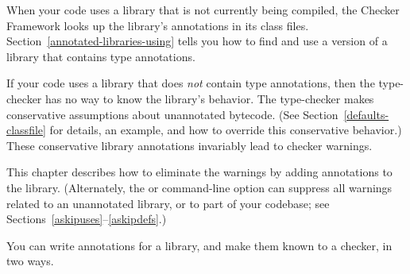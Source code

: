 \htmlhr
{}

When your code uses a library that is not currently being compiled,
the Checker Framework looks up the library's annotations in its class files.
Section~\ref{annotated-libraries-using} tells you how to find and use a
version of a library that contains type annotations.

If your code uses a library that does \emph{not} contain type annotations,
then the type-checker has no way to know the library's behavior.
The type-checker
makes conservative assumptions about unannotated bytecode.
(See
Section~\ref{defaults-classfile} for details, an example, and how to
override this conservative behavior.)
These conservative library
annotations invariably lead to checker warnings.

This chapter describes how to eliminate
the warnings by adding annotations to the library.
(Alternately, the  or  command-line
option can
suppress all warnings related to an unannotated library, or to part of your
codebase; see
Sections~\ref{askipuses}--\ref{askipdefs}.)

You can write annotations for a library, and make them known to a checker, in two ways.


